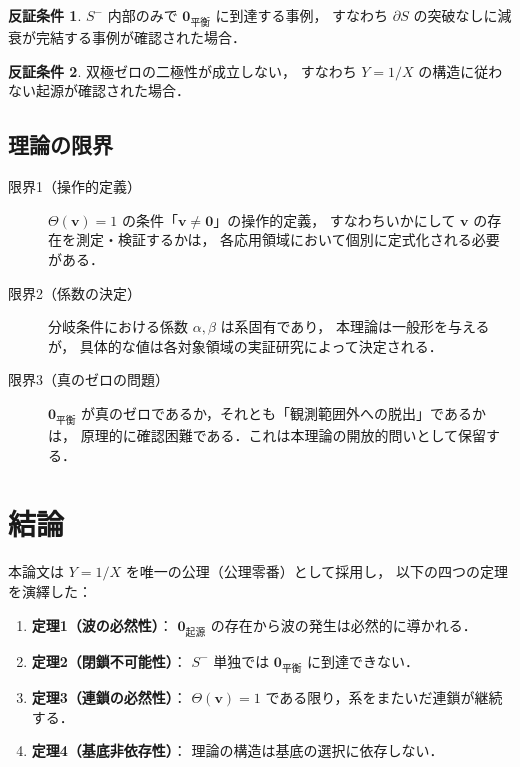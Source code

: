 \documentclass[12pt, a4paper]{article}
\theoremstyle{definition}
\newtheorem{condition}{反証条件}
\newcommand{\vzero}{\mathbf{0}}
\newcommand{\vorigin}{\mathbf{0}_{\text{起源}}}
\newcommand{\vequil}{\mathbf{0}_{\text{平衡}}}
\newcommand{\Switch}{\Theta}
\begin{document}
\begin{condition}
  $S^-$ 内部のみで $\vequil$ に到達する事例，
  すなわち $\partial S$ の突破なしに減衰が完結する事例が確認された場合．
\end{condition}

\begin{condition}
  双極ゼロの二極性が成立しない，
  すなわち $Y = 1/X$ の構造に従わない起源が確認された場合．
\end{condition}

\subsection{理論の限界}

\begin{description}
  \item[限界1（操作的定義）]
    $\Switch(\mathbf{v}) = 1$ の条件「$\mathbf{v} \neq \vzero$」の操作的定義，
    すなわちいかにして $\mathbf{v}$ の存在を測定・検証するかは，
    各応用領域において個別に定式化される必要がある．

  \item[限界2（係数の決定）]
    分岐条件における係数 $\alpha, \beta$ は系固有であり，
    本理論は一般形を与えるが，
    具体的な値は各対象領域の実証研究によって決定される．

  \item[限界3（真のゼロの問題）]
    $\vequil$ が真のゼロであるか，それとも「観測範囲外への脱出」であるかは，
    原理的に確認困難である．これは本理論の開放的問いとして保留する．
\end{description}

\section{結論}

本論文は $Y = 1/X$ を唯一の公理（公理零番）として採用し，
以下の四つの定理を演繹した：

\begin{enumerate}
  \item \textbf{定理1（波の必然性）}：
        $\vorigin$ の存在から波の発生は必然的に導かれる．
  \item \textbf{定理2（閉鎖不可能性）}：
        $S^-$ 単独では $\vequil$ に到達できない．
  \item \textbf{定理3（連鎖の必然性）}：
        $\Switch(\mathbf{v}) = 1$ である限り，系をまたいだ連鎖が継続する．
  \item \textbf{定理4（基底非依存性）}：
        理論の構造は基底の選択に依存しない．
\end{enumerate}
\end{document}
